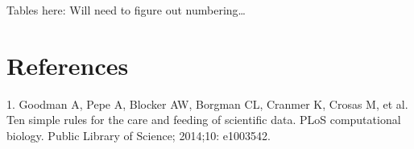 \documentclass[10pt,letterpaper]{article}
\begin{document}
Tables here: Will need to figure out numbering\ldots{}

\nolinenumbers

\section*{References}\label{references}


1. Goodman A, Pepe A, Blocker AW, Borgman CL, Cranmer K, Crosas M, et
al. Ten simple rules for the care and feeding of scientific data. PLoS
computational biology. Public Library of Science; 2014;10: e1003542.






%
%
% 
\end{document}
